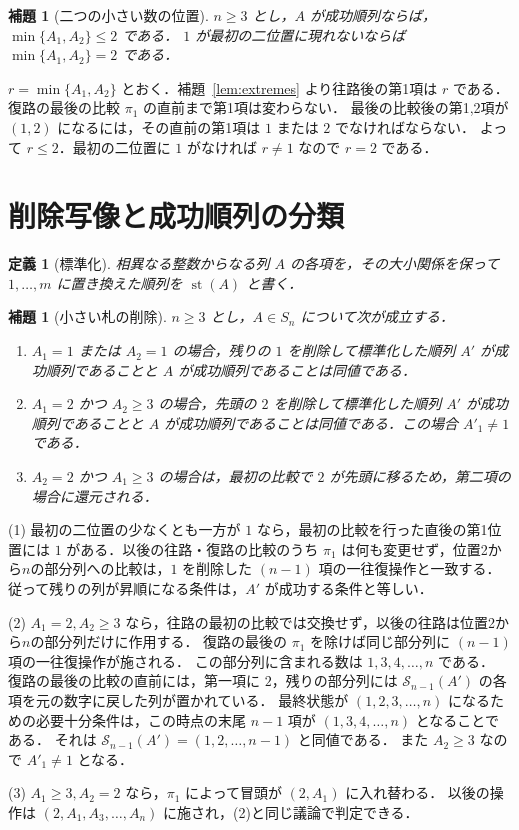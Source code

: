 \documentclass[a5paper,10pt,onecolumn]{jsarticle}
\makeatletter
\theoremstyle{mathnotetheorem}
\newtheorem{definition}[theorem]{定義}
\newtheorem{lemma}[theorem]{補題}
\renewcommand{\proofname}{証明}
\renewenvironment{proof}[1][\proofname]{%
  \par\pushQED{\qed}\normalfont\topsep4\p@\@plus2\p@\relax
  \trivlist\item[\hskip\labelsep\bfseries #1]\ignorespaces
}{\popQED\endtrivlist\@endpefalse}
\makeatother
\begin{document}
\begin{lemma}[二つの小さい数の位置]\label{lem:necessary}
$n\ge3$ とし，$A$ が成功順列ならば，$\min\{A_1,A_2\}\le2$ である．
$1$ が最初の二位置に現れないならば $\min\{A_1,A_2\}=2$ である．
\end{lemma}
\begin{proof}
$r=\min\{A_1,A_2\}$ とおく．補題~\ref{lem:extremes} より往路後の第1項は $r$ である．
復路の最後の比較 $\pi_1$ の直前まで第1項は変わらない．
最後の比較後の第1,2項が $(1,2)$ になるには，その直前の第1項は $1$ または $2$ でなければならない．
よって $r\le2$．最初の二位置に $1$ がなければ $r\ne1$ なので $r=2$ である．
\end{proof}

\section{削除写像と成功順列の分類}
\begin{definition}[標準化]
相異なる整数からなる列 $A$ の各項を，その大小関係を保って $1,\ldots,m$ に置き換えた順列を $\operatorname{st}(A)$ と書く．
\end{definition}

\begin{lemma}[小さい札の削除]\label{lem:delete}
$n\ge3$ とし，$A\in S_n$ について次が成立する．
\begin{enumerate}
\item $A_1=1$ または $A_2=1$ の場合，残りの $1$ を削除して標準化した順列 $A'$ が成功順列であることと $A$ が成功順列であることは同値である．
\item $A_1=2$ かつ $A_2\ge3$ の場合，先頭の $2$ を削除して標準化した順列 $A'$ が成功順列であることと $A$ が成功順列であることは同値である．この場合 $A'_1\ne1$ である．
\item $A_2=2$ かつ $A_1\ge3$ の場合は，最初の比較で $2$ が先頭に移るため，第二項の場合に還元される．
\end{enumerate}
\end{lemma}
\begin{proof}
(1) 最初の二位置の少なくとも一方が $1$ なら，最初の比較を行った直後の第1位置には $1$ がある．以後の往路・復路の比較のうち $\pi_1$ は何も変更せず，位置2から$n$の部分列への比較は，$1$ を削除した $(n-1)$ 項の一往復操作と一致する．
従って残りの列が昇順になる条件は，$A'$ が成功する条件と等しい．

(2) $A_1=2,A_2\ge3$ なら，往路の最初の比較では交換せず，以後の往路は位置2から$n$の部分列だけに作用する．
復路の最後の $\pi_1$ を除けば同じ部分列に $(n-1)$ 項の一往復操作が施される．
この部分列に含まれる数は $1,3,4,\ldots,n$ である．
復路の最後の比較の直前には，第一項に $2$，残りの部分列には
$\mathcal S_{n-1}(A')$ の各項を元の数字に戻した列が置かれている．
最終状態が $(1,2,3,\ldots,n)$ になるための必要十分条件は，この時点の末尾 $n-1$ 項が $(1,3,4,\ldots,n)$ となることである．
それは $\mathcal S_{n-1}(A')=(1,2,\ldots,n-1)$ と同値である．
また $A_2\ge3$ なので $A'_1\ne1$ となる．

(3) $A_1\ge3,A_2=2$ なら，$\pi_1$ によって冒頭が $(2,A_1)$ に入れ替わる．
以後の操作は $(2,A_1,A_3,\ldots,A_n)$ に施され，(2)と同じ議論で判定できる．
\end{proof}
\end{document}
